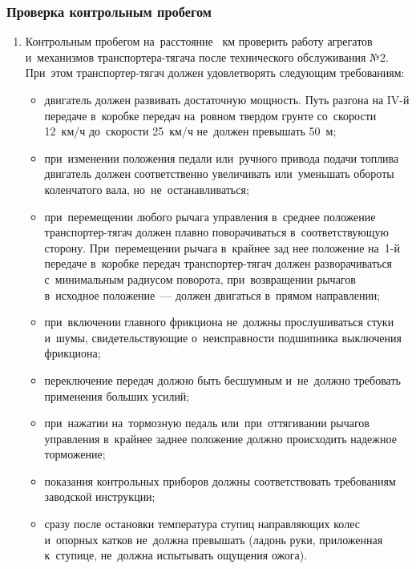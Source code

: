 \subsubsection{Проверка контрольным пробегом}
\begin{enumerate}
    \item Контрольным пробегом на~расстояние ~км проверить работу агрегатов и~механизмов транспортера-тягача после технического обслуживания №2. При~этом транспортер-тягач должен удовлетворять следующим требованиям: 
    \begin{itemize}
        \item двигатель должен развивать достаточную мощность. Путь разгона на IV-й передаче в~коробке передач на~ровном твердом грунте со~скорости 12~км/ч до~скорости 25~км/ч не~должен превышать 50~м; 
        \item при~изменении положения педали или~ручного привода подачи топлива двигатель должен соответственно увеличивать или~уменьшать обороты коленчатого вала, но~не~останавливаться; 
        \item при~перемещении любого рычага управления в~среднее положение транспортер-тягач должен плавно поворачиваться в~соответствующую сторону. При~перемещении рычага в~крайнее зад нее положение на~1-й передаче в~коробке передач транспортер-тягач должен разворачиваться с~минимальным радиусом поворота, при~возвращении рычагов в~исходное положение~--- должен двигаться в~прямом направлении; 
        \item при~включении главного фрикциона не~должны прослушиваться стуки и~шумы, свидетельствующие о~неисправности подшипника выключения фрикциона; 
        \item переключение передач должно быть бесшумным и~не~должно требовать применения больших усилий; 
        \item при~нажатии на~тормозную педаль или~при~оттягивании рычагов управления в~крайнее заднее положение должно происходить надежное торможение; 
        \item показания контрольных приборов должны соответствовать требованиям заводской инструкции; 
        \item сразу после остановки температура ступиц направляющих колес и~опорных катков не~должна превышать \celc{} (ладонь руки, приложенная к~ступице, не~должна испытывать ощущения ожога). 
    \end{itemize}
\end{enumerate}

